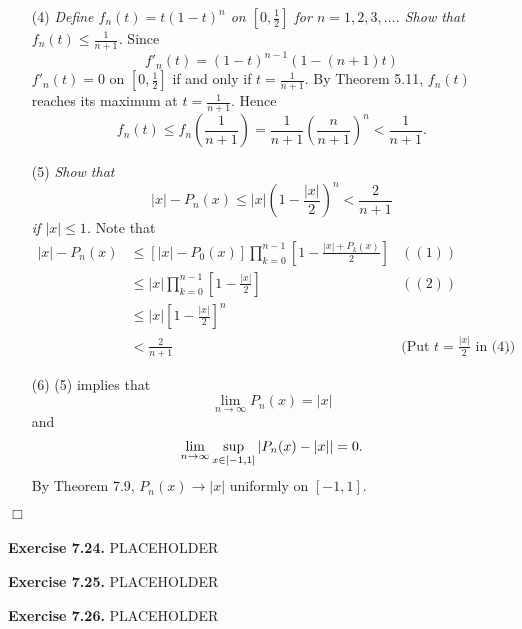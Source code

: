 \documentclass{article}
\begin{document}
\begin{enumerate}
\item[(4)]
\emph{Define $f_n(t) = t(1-t)^n$ on $\left[0,\frac{1}{2}\right]$ for $n=1,2,3,\ldots$.
Show that $f_n(t) \leq \frac{1}{n+1}$.}
Since
\[
  f'_n(t) = (1-t)^{n-1}(1 - (n+1)t)
\]
$f'_n(t) = 0$ on $\left[0,\frac{1}{2}\right]$ if and only if $t = \frac{1}{n+1}$.
By Theorem 5.11, $f_n(t)$ reaches its maximum at $t = \frac{1}{n+1}$.
Hence
\[
  f_n(t)
  \leq f_n\left(\frac{1}{n+1}\right)
  = \frac{1}{n+1} \left(\frac{n}{n+1}\right)^n
  < \frac{1}{n+1}.
\]

\item[(5)]
\emph{Show that
\[
  |x| - P_n(x) \leq |x| \left(1-\frac{|x|}{2}\right)^n < \frac{2}{n+1}
\]
if $|x| \leq 1$.}
Note that
\begin{align*}
  |x| - P_n(x)
  &\leq [ |x| - P_0(x) ] \prod_{k=0}^{n-1}\left[1-\frac{|x|+P_k(x)}{2}\right]
    & ((1)) \\
  &\leq |x| \prod_{k=0}^{n-1}\left[1-\frac{|x|}{2}\right]
    & ((2)) \\
  &\leq |x| \left[1-\frac{|x|}{2}\right]^n \\
  & < \frac{2}{n+1}
    & \text{(Put $t=\frac{|x|}{2}$ in (4))}.
\end{align*}

\item[(6)]
(5) implies that
\[
  \lim_{n \to \infty} P_n(x) = |x|
\]
and
\[
  \lim_{n \to \infty} \sup_{x \in [-1,1]}\abs{ P_n(x) - |x| } = 0.
\]
By Theorem 7.9, $P_n(x) \to |x|$ uniformly on $[-1,1]$.
\end{enumerate}
$\Box$ \\\\






\textbf{Exercise 7.24.}
PLACEHOLDER






\textbf{Exercise 7.25.}
PLACEHOLDER






\textbf{Exercise 7.26.}
PLACEHOLDER



\end{document}
